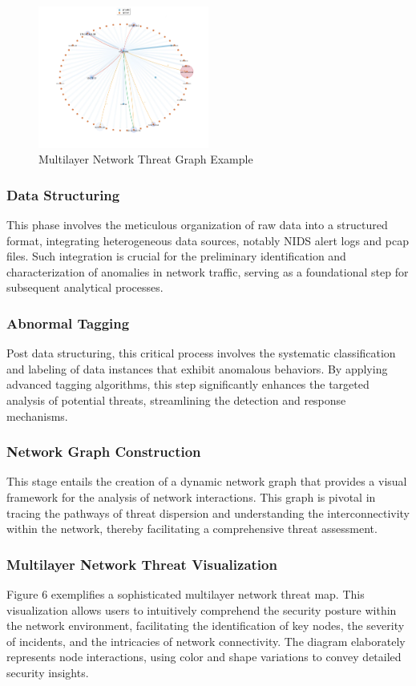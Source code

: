 \begin{figure}[htbp]
    \centering
    \includegraphics[width=0.5\textwidth]{../images/Tagging and Network Analysis.png}
    \caption{Multilayer Network Threat Graph Example}
    \label{fig:networkthreatmap}
\end{figure}

\subsubsection{Data Structuring}
This phase involves the meticulous organization of raw data into a structured format, integrating heterogeneous data sources, notably NIDS alert logs and pcap files. Such integration is crucial for the preliminary identification and characterization of anomalies in network traffic, serving as a foundational step for subsequent analytical processes.

\subsubsection{Abnormal Tagging}
Post data structuring, this critical process involves the systematic classification and labeling of data instances that exhibit anomalous behaviors. By applying advanced tagging algorithms, this step significantly enhances the targeted analysis of potential threats, streamlining the detection and response mechanisms.

\subsubsection{Network Graph Construction}
This stage entails the creation of a dynamic network graph that provides a visual framework for the analysis of network interactions. This graph is pivotal in tracing the pathways of threat dispersion and understanding the interconnectivity within the network, thereby facilitating a comprehensive threat assessment.

\subsubsection{Multilayer Network Threat Visualization}
Figure 6 exemplifies a sophisticated multilayer network threat map. This visualization allows users to intuitively comprehend the security posture within the network environment, facilitating the identification of key nodes, the severity of incidents, and the intricacies of network connectivity. The diagram elaborately represents node interactions, using color and shape variations to convey detailed security insights.

